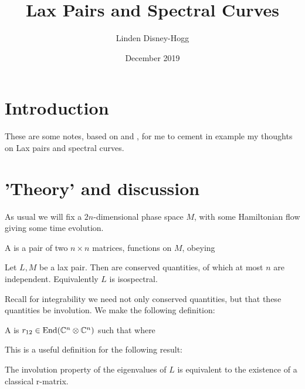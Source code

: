\documentclass{article}
\title{Lax Pairs and Spectral Curves}
\author{Linden Disney-Hogg}
\date{December 2019}
\begin{document}
\maketitle
\tableofcontents

\section{Introduction}
These are some notes, based on \cite{Beisert} and \cite{Babelon2003}, for me to cement in example my thoughts on Lax pairs and spectral curves. 

\section{'Theory' and discussion}

As usual we will fix a $2n$-dimensional phase space $M$, with some Hamiltonian flow giving some time evolution. 

\begin{definition}
A  is a pair of two $n \times n$ matrices, functions on $M$, obeying 
\end{definition}

\begin{prop}
Let $L,M$ be a lax pair. Then 
are conserved quantities, of which at most $n$ are independent. Equivalently $L$ is isospectral. 
\end{prop}

Recall for integrability we need not only conserved quantities, but that these quantities be involution. We make the following definition:

\begin{definition}
	A  is $r_{12} \in \operatorname{End}(\mathbb{C}^n \otimes \mathbb{C}^n)$ such that 
	where 
\end{definition}

This is a useful definition for the following result:

\begin{prop}
	The involution property of the eigenvalues of $L$ is equivalent to the existence of a classical r-matrix.
\end{prop}
\end{document}
